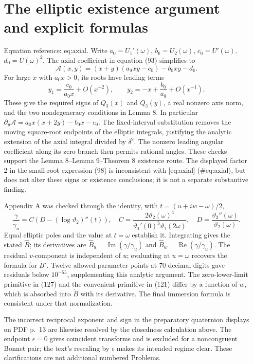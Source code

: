 \documentclass[10pt]{article}
\begin{document}
\section*{The elliptic existence argument and explicit formulas}
Equation reference: eq:axial. Write \(a_0=U_1'(\omega)\), \(b_0=U_2(\omega)\), \(c_0=U'(\omega)\), \(d_0=U(\omega)^2\). The axial coefficient in equation (93) simplifies to \[
 \mathcal A(x,y)=(x+y)(a_0xy-c_0)-b_0xy-d_0.\] For large \(x\) with \(a_0x>0\), its roots have leading terms \[y_1=\frac{c_0}{a_0x}+O(x^{-2}),\qquad
 y_2=-x+\frac{b_0}{a_0}+O(x^{-1}).\] These give the required signs of \(Q_3(x)\) and \(Q_3(y)\), a real nonzero axis norm, and the two nondegeneracy conditions in Lemma 8. In particular \(\partial_y\mathcal A=a_0x(x+2y)-b_0x-c_0\). The fixed-interval substitution removes the moving square-root endpoints of the elliptic integrals, justifying the analytic extension of the axial integral divided by \(\delta^2\). The nonzero leading angular coefficient along its zero branch then permits rational angles. These checks support the Lemma 8–Lemma 9–Theorem 8 existence route. The displayed factor \(2\) in the small-root expression (98) is inconsistent with [eq:axial] (\#eq:axial), but does not alter these signs or existence conclusions; it is not a separate substantive finding.\par
Appendix A was checked through the identity, with \(t=(u+iw-\omega)/2\), \[\frac{\gamma}{\gamma_u}
 =C\left(D-(\log\vartheta_2)''(t)\right),\quad
 C=\frac{2\vartheta_2(\omega)^4}
        {\vartheta_1'(0)^3\vartheta_1(2\omega)},\quad
 D=\frac{\vartheta_2''(\omega)}{\vartheta_2(\omega)}.\] Equal elliptic poles and the value at \(t=\omega\) establish it. Integrating gives the stated \(\widehat B\); its derivatives are \(\widehat B_u=\operatorname{Im}(\gamma/\gamma_u)\) and \(\widehat B_w=\operatorname{Re}(\gamma/\gamma_u)\). The residual \(v\)-component is independent of \(u\); evaluating at \(u=\omega\) recovers the formula for \(\widetilde B'\). Twelve allowed parameter points at 70 decimal digits gave residuals below \(10^{-55}\), supplementing this analytic argument. The zero-lower-limit primitive in (127) and the convenient primitive in (121) differ by a function of \(w\), which is absorbed into \(\widetilde B\) with its derivative. The final immersion formula is consistent under that normalization.\par
The incorrect reciprocal exponent and sign in the preparatory quaternion displays on PDF p. 13 are likewise resolved by the closedness calculation above. The endpoint \(\epsilon=0\) gives coincident transforms and is excluded for a noncongruent Bonnet pair; the text’s rescaling by \(\epsilon\) makes its intended regime clear. These clarifications are not additional numbered Problems.\par
\end{document}
